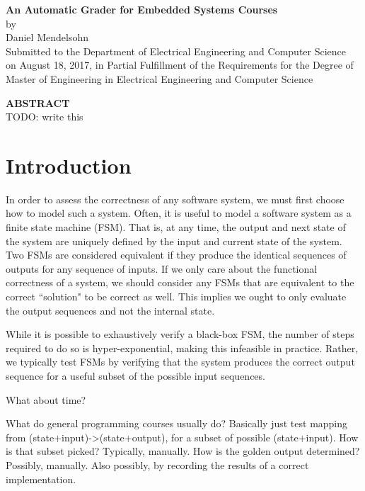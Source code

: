 \documentclass[12pt]{article}
\newcommand{\mytitle}{\textbf{An Automatic Grader for Embedded Systems Courses}}
\newcommand{\mydate}{August 18, 2017}
\begin{document}
\addtocounter{page}{1}

\newpage
\mbox{}
\newpage

\begin{center}
\mytitle \\
by \\
Daniel Mendelsohn \\
\vspace{12pt}
Submitted to the Department of Electrical Engineering and Computer Science\\
 on \mydate{}, in Partial Fulfillment of the Requirements for the Degree of\\
 Master of Engineering in Electrical Engineering and Computer Science
\end{center}
\vspace{12pt}
\textbf{ABSTRACT} \\

\noindent TODO: write this

\newpage
\mbox{}
\newpage

\tableofcontents

\doublespacing

\newpage
\section{Introduction}
In order to assess the correctness of any software system, we must first choose how to model such a system.  Often, it is useful to model a software system as a finite state machine (FSM).  That is, at any time, the output and next state of the system are uniquely defined by the input and current state of the system.  Two FSMs are considered equivalent if they produce the identical sequences of outputs for any sequence of inputs.  If we only care about the functional correctness of a system, we should consider any FSMs that are equivalent to the correct ``solution" to be correct as well.  This implies we ought to only evaluate the output sequences and not the internal state.

While it is possible to exhaustively verify a black-box FSM, the number of steps required to do so is hyper-exponential, making this infeasible in practice.  Rather, we typically test FSMs by verifying that the system produces the correct output sequence for a useful subset of the possible input sequences.
   
What about time?

What do general programming courses usually do?  Basically just test mapping from (state+input)->(state+output), for a subset of possible (state+input).  How is that subset picked?  Typically, manually.  How is the golden output determined?  Possibly, manually.  Also possibly, by recording the results of a correct implementation.
\end{document}
